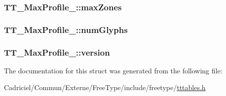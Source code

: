 \hypertarget{struct_t_t___max_profile___a07213312ec7b821a53a17d90930a478a}{
\subsubsection[{max\-Zones}]{ T\-T\-\_\-\-Max\-Profile\-\_\-\-::max\-Zones}}\label{struct_t_t___max_profile___a07213312ec7b821a53a17d90930a478a}
\hypertarget{struct_t_t___max_profile___a6ec14b34978f24173d50ab556613ade5}{
\subsubsection[{num\-Glyphs}]{ T\-T\-\_\-\-Max\-Profile\-\_\-\-::num\-Glyphs}}\label{struct_t_t___max_profile___a6ec14b34978f24173d50ab556613ade5}
\hypertarget{struct_t_t___max_profile___a59618f7c572dadc58e883d32dea46380}{
\subsubsection[{version}]{ T\-T\-\_\-\-Max\-Profile\-\_\-\-::version}}\label{struct_t_t___max_profile___a59618f7c572dadc58e883d32dea46380}


The documentation for this struct was generated from the following file\-:\begin{DoxyCompactItemize}
\item 
Cadriciel/\-Commun/\-Externe/\-Free\-Type/include/freetype/\hyperlink{tttables_8h}{tttables.\-h}\end{DoxyCompactItemize}
